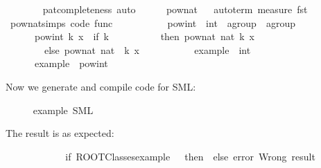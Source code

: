 \begin{isabellebody}
%
\isadelimproof
\ \ \ \ \ \ %
\endisadelimproof
%
\isatagproof
{}\isamarkupfalse%
\ pat{\isacharunderscore}completeness\ auto%
\endisatagproof
{\isafoldproof}%
%
\isadelimproof
\isanewline
%
\endisadelimproof
\ \ \ \ \isamarkupfalse%
\ pow{\isacharunderscore}nat%
\isadelimproof
\ %
\endisadelimproof
%
\isatagproof
{}\isamarkupfalse%
\ {\isacharparenleft}auto{\isacharunderscore}term\ {\isachardoublequoteopen}measure\ fst{\isachardoublequoteclose}{\isacharparenright}%
\endisatagproof
{\isafoldproof}%
%
\isadelimproof
%
\endisadelimproof
\isanewline
\ \ \ \ \isamarkupfalse%
\ pow{\isacharunderscore}nat{\isachardot}simps\ {\isacharbrackleft}code\ func{\isacharbrackright}\isanewline
\isanewline
\ \ \ \ \isamarkupfalse%
\isanewline
\ \ \ \ \ \ pow{\isacharunderscore}int\ {\isacharcolon}{\isacharcolon}\ {\isachardoublequoteopen}int\ {\isasymRightarrow}\ {\isacharprime}a{\isasymColon}group\ {\isasymRightarrow}\ {\isacharprime}a{\isasymColon}group{\isachardoublequoteclose}\isanewline
\ \ \ \ \ \ {\isachardoublequoteopen}pow{\isacharunderscore}int\ k\ x\ {\isacharequal}\ {\isacharparenleft}if\ k\ {\isachargreater}{\isacharequal}\ {}\isanewline
\ \ \ \ \ \ \ \ then\ pow{\isacharunderscore}nat\ {\isacharparenleft}nat\ k{\isacharparenright}\ x\isanewline
\ \ \ \ \ \ \ \ else\ {\isacharparenleft}pow{\isacharunderscore}nat\ {\isacharparenleft}nat\ {\isacharparenleft}{\isacharminus}\ k{\isacharparenright}{\isacharparenright}\ x{\isacharparenright}{\isasymdiv}{\isacharparenright}{\isachardoublequoteclose}\isanewline
\isanewline
\ \ \ \ \isamarkupfalse%
\isanewline
\ \ \ \ \ \ example\ {\isacharcolon}{\isacharcolon}\ int\isanewline
\ \ \ \ \ \ {\isachardoublequoteopen}example\ {\isacharequal}\ pow{\isacharunderscore}int\ {}{}\ {\isacharparenleft}{\isacharminus}{}{\isacharparenright}{\isachardoublequoteclose}%
\begin{isamarkuptext}%
\noindent Now we generate and compile code for SML:%
\end{isamarkuptext}%
\isamarkuptrue%
\ \ \ \ \isamarkupfalse%
\ example\ {\isacharparenleft}SML\ {\isacharminus}{\isacharparenright}%
\begin{isamarkuptext}%
\noindent The result is as expected:%
\end{isamarkuptext}%
\isamarkuptrue%
%
\isadelimML
\ \ \ \ %
\endisadelimML
%
\isatagML
{}\isamarkupfalse%
\ {\isacharverbatimopen}\isanewline
\ \ \ \ \ \ if\ ROOT{\isachardot}Classes{\isachardot}example\ {\isacharequal}\ {\isachartilde}{}{}\ then\ {\isacharparenleft}{\isacharparenright}\ else\ error\ {\isachardoublequote}Wrong\ result{\isachardoublequote}\isanewline
\ \ \ \ {\isacharverbatimclose}%
\endisatagML
{\isafoldML}%
%
\isadelimML
%
\endisadelimML
\isanewline
%
\isadelimtheory
\isanewline
%
\endisadelimtheory
%
\isatagtheory
{}\isamarkupfalse%
%
\endisatagtheory
{\isafoldtheory}%
%
\isadelimtheory
%
\endisadelimtheory
\isanewline
\end{isabellebody}%
